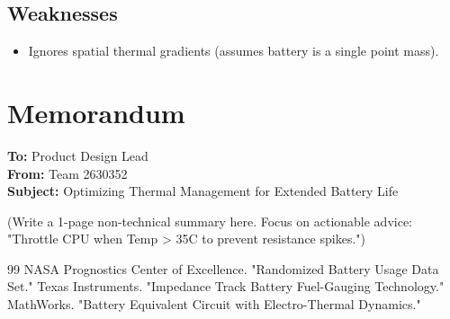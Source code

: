 \documentclass[12pt]{article}
\newcommand{\Team}{2630352}
\begin{document}
\subsection{Weaknesses}
\begin{itemize}
    \item Ignores spatial thermal gradients (assumes battery is a single point mass).
\end{itemize}

\newpage
\section*{Memorandum}
\textbf{To:} Product Design Lead \\
\textbf{From:} Team \Team \\
\textbf{Subject:} Optimizing Thermal Management for Extended Battery Life

(Write a 1-page non-technical summary here. Focus on actionable advice: "Throttle CPU when Temp > 35C to prevent resistance spikes.")

\newpage
\begin{thebibliography}{99}
 NASA Prognostics Center of Excellence. "Randomized Battery Usage Data Set."
 Texas Instruments. "Impedance Track Battery Fuel-Gauging Technology."
 MathWorks. "Battery Equivalent Circuit with Electro-Thermal Dynamics."
\end{thebibliography}

\end{document}
